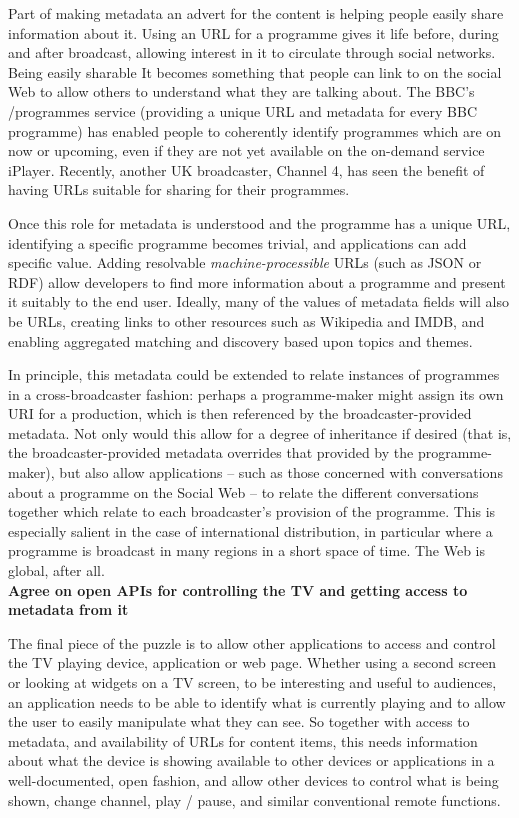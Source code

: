\documentclass[]{article}%
\begin{document}
Part of making metadata an advert for the content is helping people easily share information about it. Using an URL for a programme gives it life before, during and after broadcast, allowing interest in it to circulate through social networks. Being easily sharable It becomes something that people can link to on the social Web to allow others to understand what they are talking about.  The BBC's /programmes service (providing a unique URL and metadata for every BBC programme) has enabled people to coherently identify programmes which are on now or upcoming, even if they are not yet available on the on-demand service iPlayer. Recently, another UK broadcaster, Channel 4, has seen the benefit of having URLs suitable for sharing for their programmes.

Once this role for metadata is understood and the programme has a unique URL, identifying a specific programme becomes trivial, and applications can add specific value. Adding resolvable {\em{machine-processible}} URLs (such as JSON or RDF) allow developers to find more information about a programme and present it suitably to the end user. Ideally, many of the values of metadata fields will also be URLs, creating links to other resources such as Wikipedia and IMDB, and enabling aggregated matching and discovery based upon topics and themes.

In principle, this metadata could be extended to relate instances of programmes in a cross-broadcaster fashion: perhaps a programme-maker might assign its own URI for a production, which is then referenced by the broadcaster-provided metadata. Not only would this allow for a degree of inheritance if desired (that is, the broadcaster-provided metadata overrides that provided by the programme-maker), but also allow applications -- such as those concerned with conversations about a programme on the Social Web -- to relate the different conversations together which relate to each broadcaster's provision of the programme.  This is especially salient in the case of international distribution, in particular where a programme is broadcast in many regions in a short space of time. The Web is global, after all.
\\

{\bf{Agree on open APIs for controlling the TV and getting access to metadata from it}}

The final piece of the puzzle is to allow other applications to access and control the TV playing device, application or web page. Whether using a second screen or looking at widgets on a TV screen, to be interesting and useful to audiences, an application needs to be able to identify what is currently playing and to allow the user to easily manipulate what they can see. So together with access to metadata, and availability of URLs for content items, this needs information about what the device is showing available to other devices or applications in a well-documented, open fashion, and allow other devices to control what is being shown, change channel, play / pause, and similar conventional remote functions.
\end{document}
